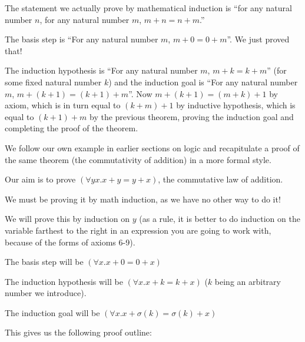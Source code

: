 \documentclass[12pt]{book}
\begin{document}
\begin{description}
The statement we actually prove by mathematical induction is ``for any
natural number $n$, for any natural number $m$, $m+n=n+m$.''

The basis step is ``For any natural number $m$, $m+0 = 0+m$''.  We
just proved that!

The induction hypothesis is ``For any natural number $m$, $m+k =
k+m$'' (for some fixed natural number $k$) and the induction goal is
``For any natural number $m$, $m+(k+1) = (k+1)+m$''.  Now $m+(k+1) =
(m+k)+1$ by axiom, which is in turn equal to $(k+m)+1$ by inductive
hypothesis, which is equal to $(k+1)+m$ by the previous theorem,
proving the induction goal and completing the proof of the theorem.

\end{description}

We follow our own example in earlier sections on logic and recapitulate a proof of the same theorem (the commutativity of addition) in a more formal style.

Our aim is to prove $(\forall yx.x+y=y+x)$, the commutative law of addition.

We must be proving it by math induction, as we have no other way to do it!

We will prove this by induction on $y$ (as a rule, it is better to do induction on the variable farthest to the right
in an expression you are going to work with, because of the forms of axioms 6-9).

The basis step will be $(\forall x.x+0=0+x)$

The induction hypothesis will be $(\forall x.x+k=k+x)$ ($k$ being an arbitrary number we introduce).

The induction goal will be $(\forall x.x+\sigma(k)=\sigma(k)+x)$

This gives us the following proof outline:
\end{document}

